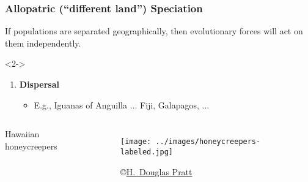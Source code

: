 \begin{frame}[t]
    \frametitle{Allopatric (``different land'') Speciation}
    \vspace{-4mm}
    \begin{adjustwidth}{-1.5em}{-1.5em}
        If populations are separated geographically, then evolutionary forces
        will act on them independently.
        \begin{uncoverenv}<2->
        \begin{enumerate}
            \item \textbf{Dispersal}
                \begin{itemize}
                    \item E.g., Iguanas of Anguilla
                        $\ldots$ Fiji, Galapagos, $\ldots$
                \end{itemize}
        \end{enumerate}
        \end{uncoverenv}
    \end{adjustwidth}

\end{frame}

\begin{frame}[t]
    \begin{adjustwidth}{-1.5em}{-1.5em}
        \begin{columns}
            Hawaiian honeycreepers

            \begin{figure}
                \begin{center}
                    \texttt{[image: ../images/honeycreepers-labeled.jpg]}
                    \caption{\tiny \copyright \href{http://www.hdouglaspratt.com/}{H.\ Douglas Pratt}}
                \end{center}
            \end{figure}
        \end{columns}
    \end{adjustwidth}
\end{frame}

